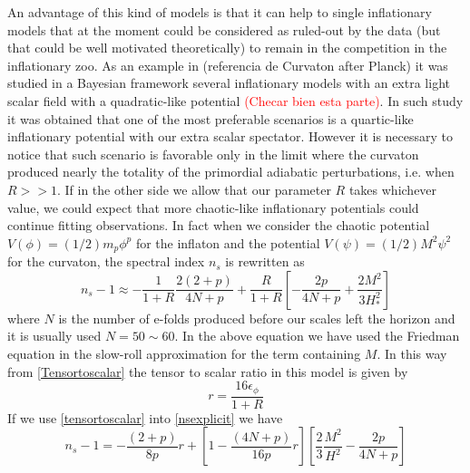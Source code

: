 \documentclass[twocolumn,           %
               showpacs,            %
               preprintnumbers,     %
               aps,                 %
               prl,          	    %
               letterpaper,             %
               superscriptaddress,      %
               nofootinbib,         %
               tightenlines,        %
               floats,floatfix      %
               ,usenatbib,
               ]{revtex4-1}
\begin{document}
An advantage of this kind of models is that it can help to single inflationary models that at the moment could be considered as ruled-out by the data (but that could be well motivated theoretically) to remain in the competition in the inflationary zoo. As an example in (referencia de Curvaton after Planck) it was studied in a Bayesian framework several inflationary models with an extra light scalar field with a quadratic-like potential \textcolor{red}{(Checar bien esta parte)}. In such study it was obtained that one of the most preferable scenarios is a quartic-like inflationary potential with our extra scalar spectator. However it is necessary to notice that such scenario is favorable only in the limit where the curvaton produced nearly the totality of the primordial adiabatic perturbations, i.e. when $R>>1$. If in the other side we allow that our parameter $R$ takes whichever value, we could expect that more chaotic-like inflationary potentials could continue fitting observations. In fact when we consider the chaotic potential $V(\phi)=(1/2)m_p\phi^p$ for the inflaton and the  potential $V(\psi)= (1/2)M^2\psi^2$ for the curvaton, the spectral index $n_s$ is rewritten as
\begin{equation}
\label{nsexplicit}
n_s-1\approx -\frac{1}{1+R}\frac{2(2+p)}{4N+p}+\frac{R}{1+R}\left[-\frac{2p}{4N+p}+\frac{2M^2}{3H_*^2}\right]
\end{equation}
where  $N$ is the number of e-folds produced before our scales left the horizon and it is usually used $N=50\sim 60$. In the above equation we have used the Friedman equation in the slow-roll approximation for the term containing $M$. In this way from \eqref{Tensortoscalar} the tensor to scalar ratio in this model is given by
\begin{equation}\label{tensortoscalar}
r=\frac{16\epsilon_\phi}{1+R}
\end{equation}		
If we use \eqref{tensortoscalar} into \eqref{nsexplicit} we have 
\begin{equation}
n_s-1=-\frac{(2+p)}{8p}r+\left[1-\frac{(4N+p)}{16p}r\right]\left[\frac{2}{3}\frac{M^2}{H^2}-\frac{2p}{4N+p}\right]
\end{equation}
\end{document}
